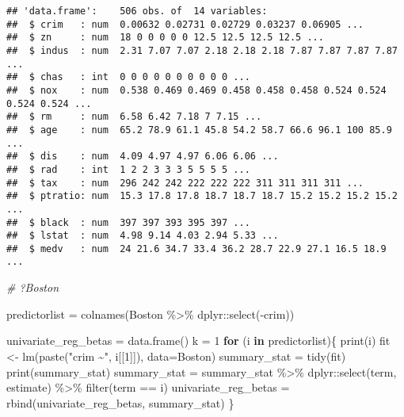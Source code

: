 \documentclass[
]{article}
\newenvironment{Shaded}{\begin{snugshade}}{\end{snugshade}}
\newcommand{\AttributeTok}[1]{\textcolor[rgb]{0.77,0.63,0.00}{#1}}
\newcommand{\CommentTok}[1]{\textcolor[rgb]{0.56,0.35,0.01}{\textit{#1}}}
\newcommand{\ControlFlowTok}[1]{\textcolor[rgb]{0.13,0.29,0.53}{\textbf{#1}}}
\newcommand{\DecValTok}[1]{\textcolor[rgb]{0.00,0.00,0.81}{#1}}
\newcommand{\FunctionTok}[1]{\textcolor[rgb]{0.00,0.00,0.00}{#1}}
\newcommand{\NormalTok}[1]{#1}
\newcommand{\OtherTok}[1]{\textcolor[rgb]{0.56,0.35,0.01}{#1}}
\newcommand{\SpecialCharTok}[1]{\textcolor[rgb]{0.00,0.00,0.00}{#1}}
\newcommand{\StringTok}[1]{\textcolor[rgb]{0.31,0.60,0.02}{#1}}
\begin{document}
\begin{verbatim}
## 'data.frame':    506 obs. of  14 variables:
##  $ crim   : num  0.00632 0.02731 0.02729 0.03237 0.06905 ...
##  $ zn     : num  18 0 0 0 0 0 12.5 12.5 12.5 12.5 ...
##  $ indus  : num  2.31 7.07 7.07 2.18 2.18 2.18 7.87 7.87 7.87 7.87 ...
##  $ chas   : int  0 0 0 0 0 0 0 0 0 0 ...
##  $ nox    : num  0.538 0.469 0.469 0.458 0.458 0.458 0.524 0.524 0.524 0.524 ...
##  $ rm     : num  6.58 6.42 7.18 7 7.15 ...
##  $ age    : num  65.2 78.9 61.1 45.8 54.2 58.7 66.6 96.1 100 85.9 ...
##  $ dis    : num  4.09 4.97 4.97 6.06 6.06 ...
##  $ rad    : int  1 2 2 3 3 3 5 5 5 5 ...
##  $ tax    : num  296 242 242 222 222 222 311 311 311 311 ...
##  $ ptratio: num  15.3 17.8 17.8 18.7 18.7 18.7 15.2 15.2 15.2 15.2 ...
##  $ black  : num  397 397 393 395 397 ...
##  $ lstat  : num  4.98 9.14 4.03 2.94 5.33 ...
##  $ medv   : num  24 21.6 34.7 33.4 36.2 28.7 22.9 27.1 16.5 18.9 ...
\end{verbatim}

\begin{Shaded}
\begin{Highlighting}[]
\CommentTok{\# ?Boston}


\NormalTok{predictorlist }\OtherTok{=} \FunctionTok{colnames}\NormalTok{(Boston }\SpecialCharTok{\%\textgreater{}\%}\NormalTok{ dplyr}\SpecialCharTok{::}\FunctionTok{select}\NormalTok{(}\SpecialCharTok{{-}}\NormalTok{crim))}

\NormalTok{univariate\_reg\_betas }\OtherTok{=} \FunctionTok{data.frame}\NormalTok{()}
\NormalTok{k }\OtherTok{=} \DecValTok{1}
\ControlFlowTok{for}\NormalTok{ (i }\ControlFlowTok{in}\NormalTok{ predictorlist)\{ }
  \FunctionTok{print}\NormalTok{(i)}
\NormalTok{  fit }\OtherTok{\textless{}{-}} \FunctionTok{lm}\NormalTok{(}\FunctionTok{paste}\NormalTok{(}\StringTok{"crim \textasciitilde{}"}\NormalTok{, i[[}\DecValTok{1}\NormalTok{]]), }\AttributeTok{data=}\NormalTok{Boston) }
\NormalTok{  summary\_stat }\OtherTok{=} \FunctionTok{tidy}\NormalTok{(fit)}
  \FunctionTok{print}\NormalTok{(summary\_stat)}
\NormalTok{  summary\_stat }\OtherTok{=}\NormalTok{ summary\_stat }\SpecialCharTok{\%\textgreater{}\%}\NormalTok{ dplyr}\SpecialCharTok{::}\FunctionTok{select}\NormalTok{(term, estimate) }\SpecialCharTok{\%\textgreater{}\%} \FunctionTok{filter}\NormalTok{(term }\SpecialCharTok{==}\NormalTok{ i)}
\NormalTok{  univariate\_reg\_betas }\OtherTok{=} \FunctionTok{rbind}\NormalTok{(univariate\_reg\_betas, summary\_stat)}
\NormalTok{\} }
\end{Highlighting}
\end{Shaded}
\end{document}
